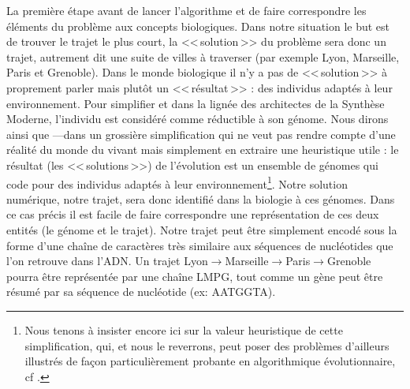 La première étape avant de lancer l'algorithme et de faire correspondre les éléments du problème aux concepts biologiques. Dans notre situation le but est de trouver le trajet le plus court, la <<\,solution\,>> du problème sera donc un trajet, autrement dit une suite de villes à traverser (par exemple Lyon, Marseille, Paris et Grenoble). Dans le monde biologique il n'y a pas de <<\,solution\,>> à proprement parler mais plutôt un <<\,résultat\,>> : des individus adaptés à leur environnement. Pour simplifier et dans la lignée des architectes de la Synthèse Moderne, l'individu est considéré comme réductible à son génome. Nous dirons ainsi que ---dans un grossière simplification qui ne veut pas rendre compte d'une réalité du monde du vivant mais simplement en extraire une heuristique utile : le résultat (les <<\,solutions\,>>) de l'évolution est un ensemble de génomes qui code pour des individus adaptés à leur environnement\footnote{Nous tenons à insister encore ici sur la valeur heuristique de cette simplification, qui, et nous le reverrons, peut poser des problèmes d'ailleurs illustrés de façon particulièrement probante en algorithmique évolutionnaire, cf \citet{huneman12computersciencemeetsevolutionarybiologypurepossibleprocessesissuegradualism}.}. Notre solution numérique, notre trajet, sera donc identifié dans la biologie à ces génomes. Dans ce cas précis il est facile de faire correspondre une représentation de ces deux entités (le génome et le trajet). Notre trajet peut être simplement encodé sous la forme d'une chaîne de caractères très similaire aux séquences de nucléotides que l'on retrouve dans l'ADN. Un trajet Lyon$\rightarrow$Marseille$\rightarrow$Paris$\rightarrow$Grenoble pourra être représentée par une chaîne LMPG, tout comme un gène peut être résumé par sa séquence de nucléotide (ex: AATGGTA).

